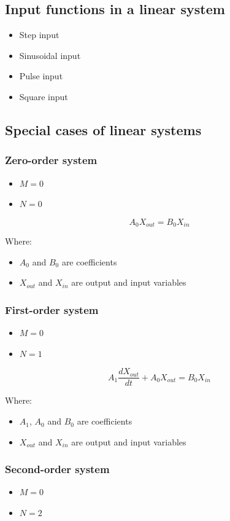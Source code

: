 \documentclass[11pt]{article}
\begin{document}
\subsection{Input functions in a linear system}
\label{sec:org8e3b873}
\begin{itemize}
\item Step input
\item Sinusoidal input
\item Pulse input
\item Square input
\end{itemize}
\subsection{Special cases of linear systems}
\label{sec:org2d25373}

\subsubsection{Zero-order system}
\label{sec:org7ed8786}
\begin{itemize}
\item \(M = 0\)
\item \(N = 0\)
\end{itemize}

\[A_0 X_{out} = B_0 X_{in}\]

Where:
\begin{itemize}
\item \(A_0\) and \(B_0\) are coefficients
\item \(X_{out}\) and \(X_{in}\) are output and input variables
\end{itemize}
\subsubsection{First-order system}
\label{sec:org491f0cf}
\begin{itemize}
\item \(M = 0\)
\item \(N = 1\)
\end{itemize}

\[A_1 \frac{dX_{out}}{dt} + A_0 X_{out} = B_0 X_{in}\]

Where:
\begin{itemize}
\item \(A_1\), \(A_0\) and \(B_0\) are coefficients
\item \(X_{out}\) and \(X_{in}\) are output and input variables
\end{itemize}
\subsubsection{Second-order system}
\label{sec:org9bacc7a}
\begin{itemize}
\item \(M = 0\)
\item \(N = 2\)
\end{itemize}
\end{document}
